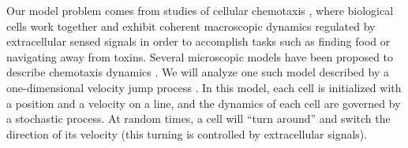\documentclass[preprint]{elsarticle}
\begin{document}
%

%
%

Our model problem comes from studies of cellular chemotaxis \cite{othmer2000diffusion}, where biological cells work together and exhibit coherent macroscopic dynamics regulated by extracellular sensed signals in order to accomplish tasks such as finding food or navigating away from toxins.
%
Several microscopic models have been proposed to describe chemotaxis dynamics \cite{othmer1988models, codling2008random}.
%
We will analyze one such model described by a one-dimensional velocity jump process \cite{othmer2000diffusion}.
%
In this model, each cell is initialized with a position and a velocity on a line, and the dynamics of each cell are governed by a stochastic process.
%
At random times, a cell will ``turn around'' and switch the direction of its velocity (this turning is controlled by extracellular signals). 
%
\end{document}
